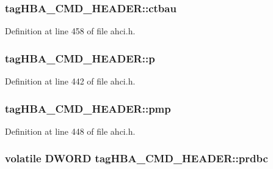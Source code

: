 \subsubsection[{\texorpdfstring{ctbau}{ctbau}}]{ tag\+H\+B\+A\+\_\+\+C\+M\+D\+\_\+\+H\+E\+A\+D\+E\+R\+::ctbau}\hypertarget{structtagHBA__CMD__HEADER_ae7a7bf6238069c6a3149cafb38de2358}{}\label{structtagHBA__CMD__HEADER_ae7a7bf6238069c6a3149cafb38de2358}


Definition at line 458 of file ahci.\+h.

\subsubsection[{\texorpdfstring{p}{p}}]{ tag\+H\+B\+A\+\_\+\+C\+M\+D\+\_\+\+H\+E\+A\+D\+E\+R\+::p}\hypertarget{structtagHBA__CMD__HEADER_a907bfe5e928116c55338fd104557af8b}{}\label{structtagHBA__CMD__HEADER_a907bfe5e928116c55338fd104557af8b}


Definition at line 442 of file ahci.\+h.

\subsubsection[{\texorpdfstring{pmp}{pmp}}]{ tag\+H\+B\+A\+\_\+\+C\+M\+D\+\_\+\+H\+E\+A\+D\+E\+R\+::pmp}\hypertarget{structtagHBA__CMD__HEADER_a7d81a1f20de80f4205d635e6975c4057}{}\label{structtagHBA__CMD__HEADER_a7d81a1f20de80f4205d635e6975c4057}


Definition at line 448 of file ahci.\+h.

\subsubsection[{\texorpdfstring{prdbc}{prdbc}}]{\setlength{\rightskip}{0pt plus 5cm}volatile {\bf D\+W\+O\+RD} tag\+H\+B\+A\+\_\+\+C\+M\+D\+\_\+\+H\+E\+A\+D\+E\+R\+::prdbc}\hypertarget{structtagHBA__CMD__HEADER_a9ad2e7d3a851051ab4387420a9f00b84}{}\label{structtagHBA__CMD__HEADER_a9ad2e7d3a851051ab4387420a9f00b84}


